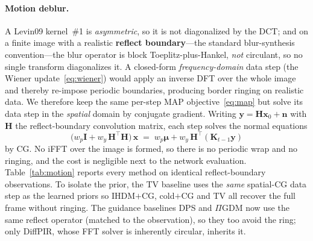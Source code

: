 \documentclass[11pt]{article}
\newcommand{\bm}[1]{\boldsymbol{#1}}  %
\newcommand{\K}{\mathbf{K}}
\newcommand{\x}{\mathbf{x}}
\newcommand{\y}{\mathbf{y}}
\newcommand{\bmu}{\bm{\mu}}
\newcommand{\I}{\mathbf{I}}
\begin{document}
\paragraph{Motion deblur.}
A Levin09 kernel~\#1 is \emph{asymmetric}, so it is not diagonalized by the DCT; and on a finite
image with a realistic \textbf{reflect boundary}---the standard blur-synthesis
convention---the blur operator is block
Toeplitz-plus-Hankel, \emph{not} circulant, so no single transform diagonalizes it. A closed-form
\emph{frequency-domain} data step (the Wiener update~\eqref{eq:wiener}) would apply an inverse DFT
over the whole image and thereby re-impose periodic boundaries, producing border ringing on
realistic data. We therefore keep the same per-step MAP objective~\eqref{eq:map} but solve its data
step in the \emph{spatial} domain by conjugate gradient. Writing $\y=\mathbf H\x_0+\bm n$ with
$\mathbf H$ the reflect-boundary convolution matrix, each step solves the normal equations
\begin{equation}
\big(w_p\I + w_y\,\mathbf H^{\!\top}\mathbf H\big)\,\x \;=\; w_p\bmu + w_y\,\mathbf H^{\!\top}(\K_{t-1}\y)
\label{eq:cg}
\end{equation}
by CG. No iFFT over the image is formed, so there is no periodic wrap and no ringing, and
the cost is negligible next to the network evaluation. Table~\ref{tab:motion} reports every method
on identical reflect-boundary observations. To isolate the prior, the TV baseline uses the
\emph{same} spatial-CG data step as the learned priors so IHDM$+$CG, cold$+$CG and TV all recover
the full frame without ringing. The guidance baselines DPS and $\Pi$GDM now use the same reflect
operator (matched to the observation), so they too avoid the ring; only DiffPIR, whose FFT solver is
inherently circular, inherits it.
\end{document}
